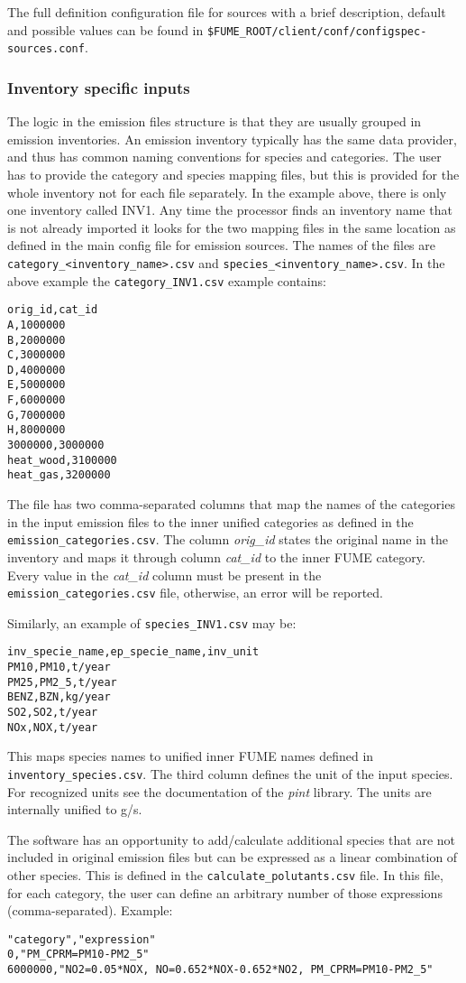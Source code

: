 \documentclass[a4paper,11pt]{article}
\begin{document}
The full definition configuration file for sources with a brief description, default and possible values can be found in \verb|$FUME_ROOT/client/conf/configspec-sources.conf|.

\subsubsection{Inventory specific inputs}
The logic in the emission files structure is that they are usually grouped in emission inventories. An emission inventory typically has the same data provider, and thus has common naming conventions for species and categories. The user has to provide the category and species mapping files, but this is provided for the whole inventory not for each file separately. In the example above, there is only one inventory called INV1. Any time the processor finds an inventory name that is not already imported it looks for the two mapping files in the same location as defined in the main config file for emission sources. The names of the files are \verb|category_<inventory_name>.csv| and \verb|species_<inventory_name>.csv|. In the above example the \verb|category_INV1.csv| example contains:
\begin{verbatim}
orig_id,cat_id
A,1000000
B,2000000
C,3000000
D,4000000
E,5000000
F,6000000
G,7000000
H,8000000
3000000,3000000
heat_wood,3100000
heat_gas,3200000
\end{verbatim}
The file has two comma-separated columns that map the names of the categories in the input emission files to the inner unified categories as defined in the \verb|emission_categories.csv|. The column {\em orig\_id} states the original name in the inventory and maps it through column {\em cat\_id} to the inner FUME category. Every value in the {\em cat\_id} column must be present in the \verb|emission_categories.csv| file, otherwise, an error will be reported.

Similarly, an example of \verb|species_INV1.csv| may be:
\begin{verbatim}
inv_specie_name,ep_specie_name,inv_unit
PM10,PM10,t/year
PM25,PM2_5,t/year
BENZ,BZN,kg/year
SO2,SO2,t/year
NOx,NOX,t/year
\end{verbatim}
This maps species names to unified inner FUME names defined in \verb|inventory_species.csv|. The third column defines the unit of the input species. For recognized units see the documentation of the {\em pint} library. The units are internally unified to g/s.

The software has an opportunity to add/calculate additional species that are not included in original emission files but can be expressed as a linear combination of other species. This is defined in the \verb|calculate_polutants.csv| file. In this file, for each category, the user can define an arbitrary number of those expressions (comma-separated). Example:
\begin{verbatim}
"category","expression"
0,"PM_CPRM=PM10-PM2_5"
6000000,"NO2=0.05*NOX, NO=0.652*NOX-0.652*NO2, PM_CPRM=PM10-PM2_5"
\end{verbatim}
\end{document}
